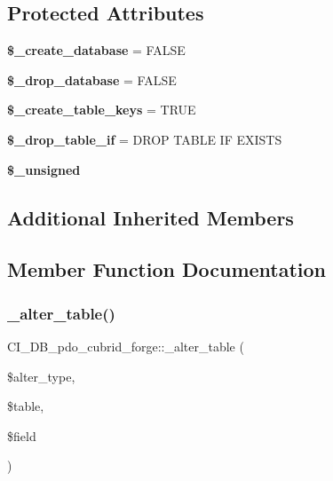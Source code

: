 \subsection*{Protected Attributes}
\begin{DoxyCompactItemize}
\item 
\mbox{\label{class_c_i___d_b__pdo__cubrid__forge_afc2eef6c60bc9960ce52c129a7c37256}} 
{\bfseries \$\+\_\+create\+\_\+database} = F\+A\+L\+SE
\item 
\mbox{\label{class_c_i___d_b__pdo__cubrid__forge_ac2bab94da917c5b5ec8a0de51f821598}} 
{\bfseries \$\+\_\+drop\+\_\+database} = F\+A\+L\+SE
\item 
\mbox{\label{class_c_i___d_b__pdo__cubrid__forge_aa7b802264625e9720022498f719bf07e}} 
{\bfseries \$\+\_\+create\+\_\+table\+\_\+keys} = T\+R\+UE
\item 
\mbox{\label{class_c_i___d_b__pdo__cubrid__forge_a69a051696a8df4d22327d83af9ccb11d}} 
{\bfseries \$\+\_\+drop\+\_\+table\+\_\+if} = \textquotesingle{}D\+R\+OP T\+A\+B\+LE IF E\+X\+I\+S\+TS\textquotesingle{}
\item 
{\bfseries \$\+\_\+unsigned}
\end{DoxyCompactItemize}
\subsection*{Additional Inherited Members}


\subsection{Member Function Documentation}
\mbox{\label{class_c_i___d_b__pdo__cubrid__forge_ae91bfc16e4acc53e5b7c1ecc43d92222}} 
\subsubsection{\texorpdfstring{\+\_\+alter\+\_\+table()}{\_alter\_table()}}
{\footnotesize\ttfamily C\+I\+\_\+\+D\+B\+\_\+pdo\+\_\+cubrid\+\_\+forge\+::\+\_\+alter\+\_\+table (\begin{DoxyParamCaption}\item[{}]{\$alter\+\_\+type,  }\item[{}]{\$table,  }\item[{}]{\$field }\end{DoxyParamCaption})\hspace{0.3cm}{\ttfamily [protected]}}

